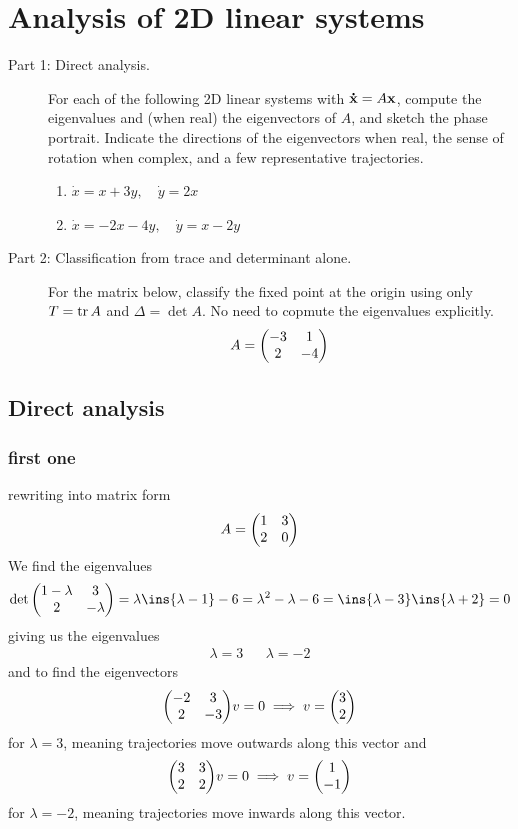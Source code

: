 \clearpage
\section{Analysis of 2D linear systems}
\begin{colbox}
    \begin{description}
        \item[Part 1: Direct analysis.] For each of the following 2D linear systems with \(\vb{\dot{x}}=A\vb{x}\), compute the eigenvalues and (when real) the eigenvectors of \(A\), and sketch the phase portrait. Indicate the directions of the eigenvectors when real, the sense of rotation when complex, and a few representative trajectories. \begin{enumerate}
            \item \(\dot{x}=x+3y, \quad \dot{y}=2x\)
            \item \(\dot{x}=-2x-4y,\quad \dot{y}=x-2y\)
        \end{enumerate}
        \item[Part 2: Classification from trace and determinant alone.] For the matrix below, classify the fixed point at the origin using only \(T=\tr A\) and \(\Delta = \det A\). No need to copmute the eigenvalues explicitly.\begin{equation}
            A = \mqty(-3 & 1 \\ 2 & -4)
        \end{equation}
    \end{description}
\end{colbox}
\subsection{Direct analysis}
\subsubsection{first one}
rewriting into matrix form 
\begin{equation}
    A = \mqty(1&3\\2&0)
\end{equation}
We find the eigenvalues
\begin{align}
    \det\mqty(1-\lambda & 3\\2&-\lambda) = \lambda\ins{\lambda-1}-6=\lambda^2-\lambda-6 = \ins{\lambda-3}\ins{\lambda+2}=0
\end{align}
giving us the eigenvalues 
\begin{align}
    \lambda = 3 && \lambda = -2
\end{align}
and to find the eigenvectors 
\begin{equation}
    \mqty(-2 & 3\\2&-3)v = 0 \implies v=\mqty(3\\2)
\end{equation}
for \(\lambda = 3\), meaning trajectories move outwards along this vector and 
\begin{equation}
    \mqty(3 & 3\\2&2)v=0 \implies v=\mqty(1\\-1)
\end{equation}
for \(\lambda = -2\), meaning trajectories move inwards along this vector.
